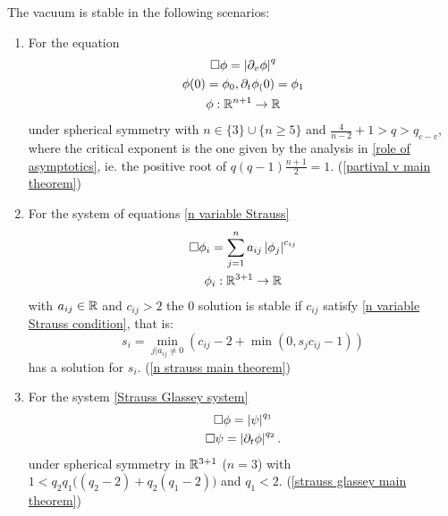 \documentclass[11pt, oneside]{amsart}
\begin{document}
	\begin{theorem*}
		The vacuum is stable in the following scenarios:
		\begin{enumerate}
			\item 	For the equation
			\begin{equation}\label{partial v}
				\begin{gathered}
					\Box\phi=\left\lvert \partial_v\phi\right\rvert^q\\
					\phi(0)=\phi_0,\partial_t\phi_(0)=\phi_1\\
					\phi:\mathbb{R}^{n+1}\to\mathbb{R}
				\end{gathered}
			\end{equation}
			under spherical symmetry with $n\in\{3\}\cup\{n\geq5\}$ and $\frac{4}{n-2}+1>q>q_{c-v}$, where the critical exponent is the one given by the analysis in \cref{role of asymptotics}, ie. the positive root of $q(q-1)\frac{n+1}{2}=1$. (\cref{partival v main theorem})
			\item  For the system of equations \cref{n variable Strauss}
			\begin{equation*}
				\begin{gathered}
					\Box\phi_i=\sum_{j=1}^na_{ij}\left\lvert \phi_j\right\rvert^{c_{ij}}\\
					\phi_i:\mathbb{R}^{3+1}\to\mathbb{R}
				\end{gathered}
			\end{equation*}
			with $a_{ij}\in\mathbb{R}$ and $c_{ij}>2$ the $0$ solution is stable if $c_{ij}$ satisfy \cref{n variable Strauss condition}, that is:
			\begin{equation*}
				s_i=\min_{j|a_{ij}\neq0}(c_{ij}-2+\min(0,s_jc_{ij}-1))
			\end{equation*}
			has a solution for $s_i$. (\cref{n strauss main theorem})
			\item  For the system \eqref{Strauss Glassey system}
			\begin{equation*}
				\begin{gathered}
					\Box\phi=\left\lvert \psi\right\rvert^{q_1}\\
					\Box\psi=\left\lvert \partial_t\phi\right\rvert^{q_2}.
				\end{gathered}
			\end{equation*}
			under spherical symmetry in $\mathbb{R}^{3+1}$ ($n=3$) with $1<q_2q_1\big((q_2-2)+q_2(q_1-2)\big)$ and $q_1<2$.  (\cref{strauss glassey main theorem})
		\end{enumerate}
	\end{theorem*}
\end{document}
